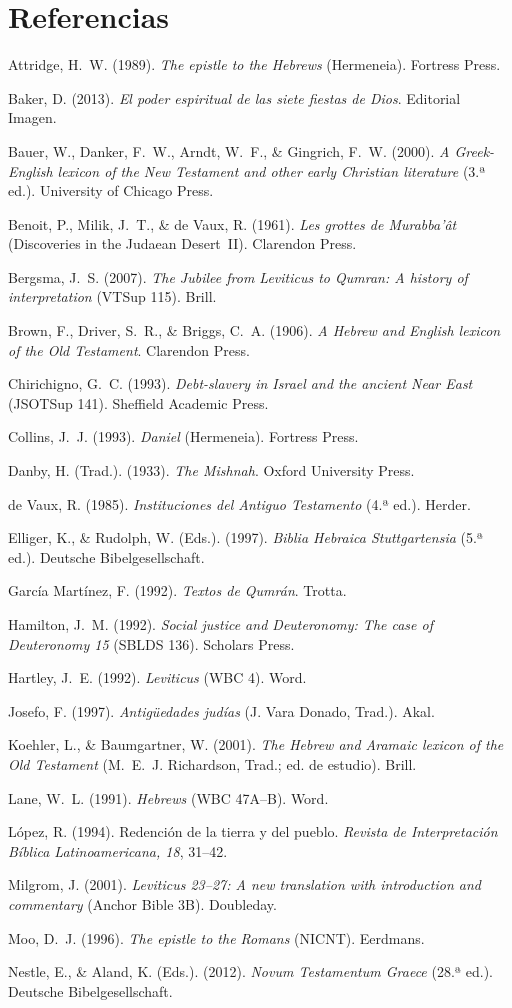 \documentclass[11pt,letterpaper]{article}
\newcommand{\refapa}[1]{\par{\RaggedRight\hangindent=1.27cm\hangafter=1\noindent #1\par}\vspace{4pt}}
\begin{document}
\section*{Referencias}
\small
\refapa{Attridge, H.~W. (1989). \emph{The epistle to the Hebrews} (Hermeneia). Fortress Press.}
\refapa{Baker, D. (2013). \emph{El poder espiritual de las siete fiestas de Dios}. Editorial Imagen.}
\refapa{Bauer, W., Danker, F.~W., Arndt, W.~F., \& Gingrich, F.~W. (2000). \emph{A Greek-English lexicon of the New Testament and other early Christian literature} (3.ª ed.). University of Chicago Press.}
\refapa{Benoit, P., Milik, J.~T., \& de Vaux, R. (1961). \emph{Les grottes de Murabba'ât} (Discoveries in the Judaean Desert~II). Clarendon Press.}
\refapa{Bergsma, J.~S. (2007). \emph{The Jubilee from Leviticus to Qumran: A history of interpretation} (VTSup 115). Brill.}
\refapa{Brown, F., Driver, S.~R., \& Briggs, C.~A. (1906). \emph{A Hebrew and English lexicon of the Old Testament}. Clarendon Press.}
\refapa{Chirichigno, G.~C. (1993). \emph{Debt-slavery in Israel and the ancient Near East} (JSOTSup 141). Sheffield Academic Press.}
\refapa{Collins, J.~J. (1993). \emph{Daniel} (Hermeneia). Fortress Press.}
\refapa{Danby, H. (Trad.). (1933). \emph{The Mishnah}. Oxford University Press.}
\refapa{de Vaux, R. (1985). \emph{Instituciones del Antiguo Testamento} (4.ª ed.). Herder.}
\refapa{Elliger, K., \& Rudolph, W. (Eds.). (1997). \emph{Biblia Hebraica Stuttgartensia} (5.ª ed.). Deutsche Bibelgesellschaft.}
\refapa{García Martínez, F. (1992). \emph{Textos de Qumrán}. Trotta.}
\refapa{Hamilton, J.~M. (1992). \emph{Social justice and Deuteronomy: The case of Deuteronomy 15} (SBLDS 136). Scholars Press.}
\refapa{Hartley, J.~E. (1992). \emph{Leviticus} (WBC 4). Word.}
\refapa{Josefo, F. (1997). \emph{Antigüedades judías} (J. Vara Donado, Trad.). Akal.}
\refapa{Koehler, L., \& Baumgartner, W. (2001). \emph{The Hebrew and Aramaic lexicon of the Old Testament} (M.~E.~J. Richardson, Trad.; ed. de estudio). Brill.}
\refapa{Lane, W.~L. (1991). \emph{Hebrews} (WBC 47A--B). Word.}
\refapa{López, R. (1994). Redención de la tierra y del pueblo. \emph{Revista de Interpretación Bíblica Latinoamericana, 18}, 31--42.}
\refapa{Milgrom, J. (2001). \emph{Leviticus 23--27: A new translation with introduction and commentary} (Anchor Bible 3B). Doubleday.}
\refapa{Moo, D.~J. (1996). \emph{The epistle to the Romans} (NICNT). Eerdmans.}
\refapa{Nestle, E., \& Aland, K. (Eds.). (2012). \emph{Novum Testamentum Graece} (28.ª ed.). Deutsche Bibelgesellschaft.}
\end{document}
